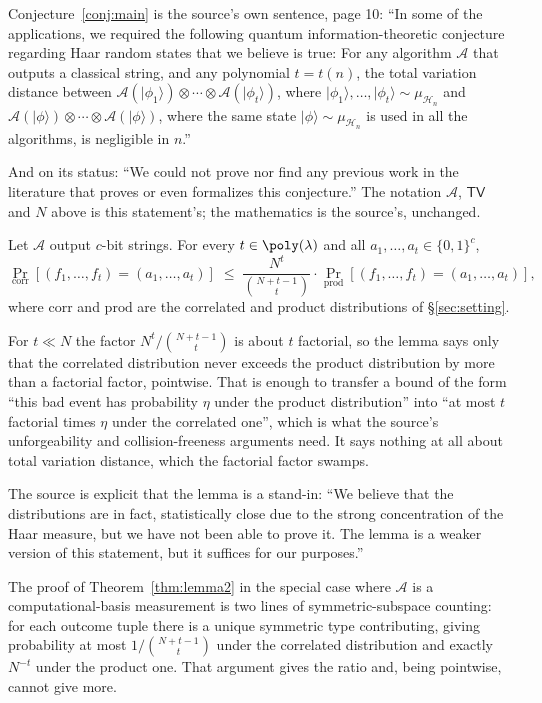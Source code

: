 \documentclass{conjura-conjecture}
\newcommand{\bits}{\{0,1\}}
\newcommand{\muH}{\mu_{\mathcal{H}_{n}}}
\newcommand{\A}{\mathcal{A}}
\newcommand{\TV}{\mathsf{TV}}
\newcommand{\ket}[1]{\lvert#1\rangle}
\begin{document}
\begin{remark}\label{rem:framing}
Conjecture~\ref{conj:main} is the source's own sentence, page 10:
``In some of the applications, we required the following quantum
information-theoretic conjecture regarding Haar random states that we
believe is true: For any algorithm $\A$ that outputs a classical string,
and any polynomial $t = t(n)$, the total variation distance between
$\A(\ket{\phi_1}) \otimes \cdots \otimes \A(\ket{\phi_t})$, where
$\ket{\phi_1}, \dots, \ket{\phi_t} \sim \muH$ and
$\A(\ket{\phi}) \otimes \cdots \otimes \A(\ket{\phi})$, where the same
state $\ket{\phi} \sim \muH$ is used in all the algorithms, is negligible
in $n$.''

And on its status: ``We could not prove nor find any previous work in the
literature that proves or even formalizes this conjecture.'' The
notation $\A$, $\TV$ and $N$ above is this statement's; the mathematics
is the source's, unchanged.
\end{remark}

\begin{theorem}\label{thm:lemma2}
Let $\A$ output $c$-bit strings. For every $t \in \poly(\lambda)$ and all
$a_1, \dots, a_t \in \bits^{c}$,
\[
  \Pr_{\mathrm{corr}}[(f_1,\dots,f_t) = (a_1,\dots,a_t)]
  \;\le\;
  \frac{N^{t}}{\binom{N+t-1}{t}} \cdot
  \Pr_{\mathrm{prod}}[(f_1,\dots,f_t) = (a_1,\dots,a_t)],
\]
where $\mathrm{corr}$ and $\mathrm{prod}$ are the correlated and product
distributions of \S\ref{sec:setting}.
\end{theorem}

\begin{remark}\label{rem:gap}
For $t \ll N$ the factor $N^{t} / \binom{N+t-1}{t}$ is about $t$ factorial, so the
lemma says only that the correlated distribution never exceeds the
product distribution by more than a factorial factor, pointwise. That is
enough to transfer a bound of the form ``this bad event has probability
$\eta$ under the product distribution'' into ``at most $t$ factorial times $\eta$
under the correlated one'', which is what the source's unforgeability and
collision-freeness arguments need. It says nothing at all about total
variation distance, which the factorial factor swamps.

The source is explicit that the lemma is a stand-in: ``We believe that
the distributions are in fact, statistically close due to the strong
concentration of the Haar measure, but we have not been able to prove
it. The lemma is a weaker version of this statement, but it suffices for
our purposes.''

The proof of Theorem~\ref{thm:lemma2} in the special case where $\A$ is a
computational-basis measurement is two lines of symmetric-subspace
counting: for each outcome tuple there is a unique symmetric type
contributing, giving probability at most $1/\binom{N+t-1}{t}$ under the
correlated distribution and exactly $N^{-t}$ under the product one. That
argument gives the ratio and, being pointwise, cannot give more.
\end{remark}
\end{document}
